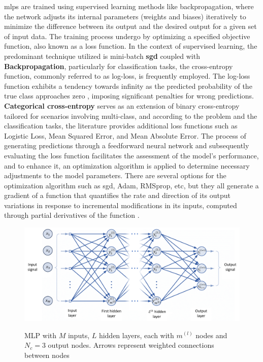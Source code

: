 \gls{mlp}s are trained using supervised learning methods like backpropagation, where the network adjusts its internal parameters (weights and biases) iteratively to minimize the difference between its output and the desired output for a given set of input data. %
The training process undergo by optimizing a specified objective function, also known as a loss function. In the context of supervised learning, the predominant technique utilized is mini-batch \textbf{\gls{sgd}} coupled with \textbf{Backpropagation}, particularly for classification tasks, the cross-entropy function, commonly referred to as log-loss, is frequently employed. The log-loss function exhibits a tendency towards infinity as the predicted probability of the true class approaches zero %
, imposing significant penalties for wrong predictions. \textbf{Categorical cross-entropy} serves as an extension of binary cross-entropy tailored for scenarios involving multi-class, and according to the problem and the classification tasks, the literature provides additional loss functions such as Logistic Loss, Mean Squared Error, and Mean Absolute Error. The process of generating predictions through a feedforward neural network and subsequently evaluating the loss function facilitates the assessment of the model's performance, and to enhance it, an optimization algorithm is applied to determine necessary adjustments to the model parameters. There are several options for the optimization algorithm such as \gls{sgd}, Adam, RMSprop, etc, but they all generate a gradient of a function that quantifies the rate and direction of its output variations in response to incremental modifications in its inputs, computed through partial derivatives of the function \cite{Bishop2023}. 

\begin{figure}[htbp]
    \raggedright
        \caption{MLP with $M$ inputs, $L$ hidden layers, each with $m^{(l)}$ nodes and $N_c = 3$ output nodes. Arrows represent weighted connections between nodes}
        \includegraphics[width=1\textwidth]{resources/images/030-theoretical_framework/Framework_ann_mlp.png}
        \label{fig:frmwk_ann_mlp}
\end{figure}

